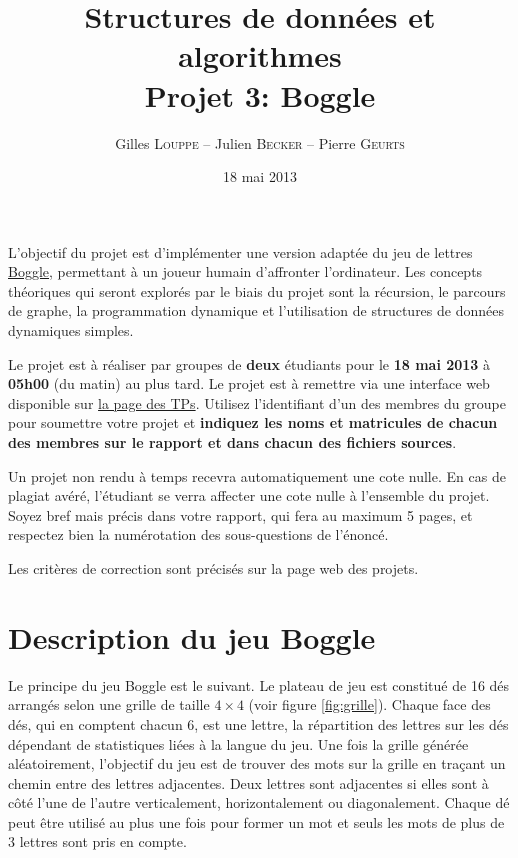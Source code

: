 \documentclass[a4paper,10pt]{article}
\title{
    \textbf{Structures de données et algorithmes}\\
    Projet 3: Boggle
}
\author{Gilles \textsc{Louppe} -- Julien \textsc{Becker} -- Pierre \textsc{Geurts}}
\date{18 mai 2013}
\begin{document}
\maketitle

L'objectif du projet est d'implémenter une version adaptée du jeu de
lettres \href{http://fr.wikipedia.org/wiki/Boggle}{Boggle}, permettant à un
joueur humain d'affronter l'ordinateur. Les concepts théoriques qui
seront explorés par le biais du projet sont la récursion, le parcours
de graphe, la programmation dynamique et l'utilisation de structures de
données dynamiques simples.

Le projet est à réaliser par groupes de {\bf deux} étudiants pour
le {\bf 18 mai 2013} à {\bf 05h00} (du matin) au plus tard. Le projet
est à remettre via une interface web disponible sur
\href{http://www.montefiore.ulg.ac.be/~glouppe/2012-2013/students.info0902.php}{la
  page des TPs}. Utilisez l'identifiant d'un des membres du groupe
  pour soumettre votre projet et \textbf{indiquez les noms et matricules de chacun des membres
  sur le rapport et dans chacun des fichiers sources}.

Un projet non rendu à temps recevra automatiquement une cote nulle. En
cas de plagiat avéré, l'étudiant se verra affecter une cote nulle à
l'ensemble du projet. Soyez bref mais précis dans votre rapport, qui
fera au maximum 5 pages, et respectez bien la numérotation des
sous-questions de l'énoncé.

Les critères de correction sont précisés sur la page web des projets.

\section{Description du jeu Boggle}

Le principe du jeu Boggle est le suivant. Le plateau de jeu est constitué
de 16 dés arrangés selon une grille de taille $4\times 4$ (voir figure
\ref{fig:grille}). Chaque face des dés, qui en comptent chacun 6, est
une lettre, la répartition des lettres sur les dés dépendant de
statistiques liées à la langue du jeu. Une fois la grille générée
aléatoirement, l'objectif du jeu est de trouver des mots sur la grille
en traçant un chemin entre des lettres adjacentes. Deux lettres sont
adjacentes si elles sont à côté l'une de l'autre verticalement,
horizontalement ou diagonalement. Chaque dé peut être utilisé au plus
une fois pour former un mot et seuls les mots de plus de 3 lettres
sont pris en compte.
\end{document}
